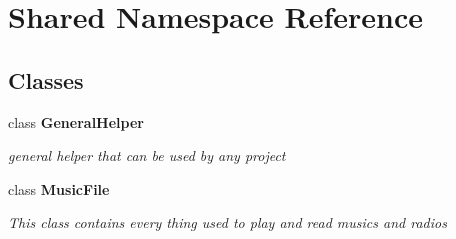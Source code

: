 \hypertarget{namespace_shared}{}\section{Shared Namespace Reference}
\label{namespace_shared}
\subsection*{Classes}
\begin{DoxyCompactItemize}
\item 
class {\bfseries General\+Helper}
\begin{DoxyCompactList}\small\item\em general helper that can be used by any project \end{DoxyCompactList}\item 
class {\bfseries Music\+File}
\begin{DoxyCompactList}\small\item\em This class contains every thing used to play and read musics and radios \end{DoxyCompactList}\end{DoxyCompactItemize}
